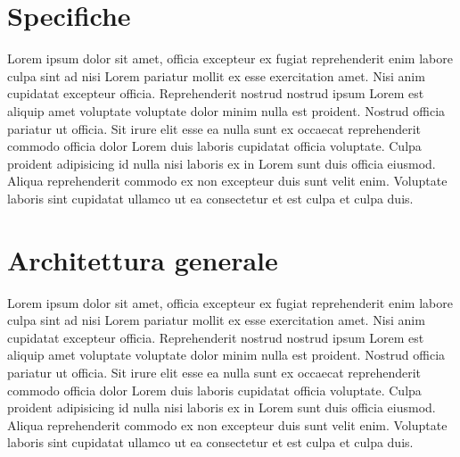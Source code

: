 \documentclass[a4paper]{article}
\begin{document}


\tableofcontents
\pagebreak

\section{Specifiche}
Lorem ipsum dolor sit amet, officia excepteur ex fugiat reprehenderit enim labore culpa sint ad nisi Lorem pariatur mollit ex esse exercitation amet. Nisi anim cupidatat excepteur officia. Reprehenderit nostrud nostrud ipsum Lorem est aliquip amet voluptate voluptate dolor minim nulla est proident. Nostrud officia pariatur ut officia. Sit irure elit esse ea nulla sunt ex occaecat reprehenderit commodo officia dolor Lorem duis laboris cupidatat officia voluptate. Culpa proident adipisicing id nulla nisi laboris ex in Lorem sunt duis officia eiusmod. Aliqua reprehenderit commodo ex non excepteur duis sunt velit enim. Voluptate laboris sint cupidatat ullamco ut ea consectetur et est culpa et culpa duis.


\section{Architettura generale}
Lorem ipsum dolor sit amet, officia excepteur ex fugiat reprehenderit enim labore culpa sint ad nisi Lorem pariatur mollit ex esse exercitation amet. Nisi anim cupidatat excepteur officia. Reprehenderit nostrud nostrud ipsum Lorem est aliquip amet voluptate voluptate dolor minim nulla est proident. Nostrud officia pariatur ut officia. Sit irure elit esse ea nulla sunt ex occaecat reprehenderit commodo officia dolor Lorem duis laboris cupidatat officia voluptate. Culpa proident adipisicing id nulla nisi laboris ex in Lorem sunt duis officia eiusmod. Aliqua reprehenderit commodo ex non excepteur duis sunt velit enim. Voluptate laboris sint cupidatat ullamco ut ea consectetur et est culpa et culpa duis.
\end{document}
